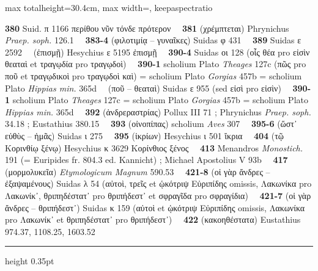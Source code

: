 \documentclass[11pt,twoside]{book}
\newcommand{\italique}[1]{\textit{#1}}
\newcommand{\Eustathe}{Eustathius }
\newcommand{\EtymMagnum}{\textit{Etymologicum Magnum} }
\newcommand{\Apostol}{Michael Apostolius }
\newcommand{\Phryn}{Phrynichus \textit{Praep. soph.} }
\newcommand{\espTest}{\ {\color{ruleGold}{\policeFr ∥}}\ }
\begin{document}
\begin{adjustbox}{max totalheight=30.4cm, max width=\textwidth, keepaspectratio}
\begin{minipage}{\textwidth}
{ \textbf{380} Suid. π 1166 περίθου νῦν τόνδε πρότερον \espTest \textbf{381} (χρέμπτεται) \Phryn 126.1 \espTest \textbf{383-4} (φιλοτιμίᾳ -- γυναῖκες) Suidas φ 431 \espTest \textbf{389} Suidas ε 2592 \espTest (ἐπισμῇ) Hesychius ε 5195 ἐπισμῇ \espTest \textbf{390-4} Suidas οι 128 (οἷς θέα pro εἰσὶν θεαταὶ et τραγῳδία pro τραγῳδοὶ) \espTest \textbf{390-1} scholium Plato \italique{Theages} 127c (πῶς pro ποῦ et τραγῳδικοὶ pro τραγῳδοὶ καὶ) = scholium Plato \italique{Gorgias} 457b = scholium Plato \italique{Hippias min.} 365d \espTest (ποῦ -- θεαταὶ) Suidas ε 955 (sed εἰσὶ pro εἰσὶν) \espTest \textbf{390-1} scholium Plato \italique{Theages} 127c = scholium Plato \italique{Gorgias} 457b = scholium Plato \italique{Hippias min.} 365d \espTest \textbf{392} (ἀνδρεραστρίας) Pollux III 71 ; \Phryn 34.18 ; \Eustathe 380.15 \espTest \textbf{393} (οἰνοπίπας) scholium \italique{Aves} 307 \espTest \textbf{395-6} (ὥστ᾽ εὐθὺς -- ἡμᾶς) Suidas ι 275 \espTest \textbf{395} (ἰκρίων) Hesychius ι 501 ἴκρια \espTest \textbf{404} (τῷ Κορινθίῳ ξένῳ) Hesychius κ 3629 Κορίνθιος ξένος \espTest \textbf{413} Menandros \italique{Monostich.} 191 (= Euripides fr. 804.3 ed. Kannicht) ; \Apostol V 93b \espTest \textbf{417} (μορμολυκεῖα) \EtymMagnum 590.53 \espTest \textbf{421-8} (οἱ γὰρ ἄνδρες -- ἐξαψαμένους) Suidas λ 54 (αὐτοὶ, τρεῖς et ᾡκότριψ Εὐριπίδης omissis, Λακωνίκα pro Λακωνίκ᾽, θριπηδέστατ᾽ pro θριπήδεστ᾽ et σφραγῖδα pro σφραγίδια) \espTest \textbf{421-7} (οἱ γὰρ ἄνδρες -- θριπήδεστ᾽) Suidas κ 159 (αὐτοὶ et ᾡκότριψ Εὐριπίδης omissis, Λακωνίκα pro Λακωνίκ᾽ et θριπηδέστατ᾽ pro θριπήδεστ᾽) \espTest \textbf{422} (κακοηθέστατα) \Eustathe 974.37, 1108.25, 1603.52\par\vspace{2.5pt}
{\color{ruleGold}\hrule height 0.35pt}\vspace{2.5pt}
}
\end{minipage}
\end{adjustbox}
\end{document}
